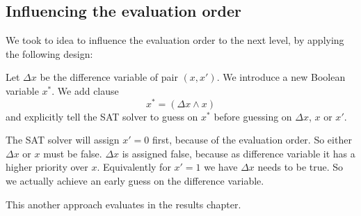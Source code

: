 \subsection{Influencing the evaluation order}
\label{sec:enc-diff-desc-eo}
%
We took to idea to influence the evaluation order to the next level,
by applying the following design:

Let $\Delta x$ be the difference variable of pair $(x, x')$. We introduce a new Boolean
variable $x^*$. We add clause
\[ x^* = (\Delta x \land x) \]
and explicitly tell the SAT solver to guess on $x^*$ before guessing on $\Delta x$, $x$ or $x'$.

The SAT solver will assign $x'=0$ first, because of the evaluation order. So either $\Delta x$
or $x$ must be false. $\Delta x$ is assigned false, because as difference variable it has a higher
priority over $x$. Equivalently for $x'=1$ we have $\Delta x$ needs to be true. So we actually
achieve an early guess on the difference variable.

This another approach evaluates in the results chapter.
